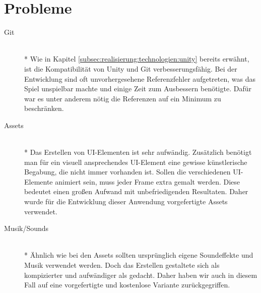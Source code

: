 \newpage
\section{Probleme}
\label{sec:implementierung:probleme}
\begin{description}
    \item[Git] \hfill \\* Wie in Kapitel \ref{subsec:realisierung:technologien:unity} bereits erwähnt, ist die Kompatibilität von Unity und Git verbesserungsfähig. Bei der Entwicklung sind oft unvorhergesehene Referenzfehler aufgetreten, was das Spiel unspielbar machte und einige Zeit zum Ausbessern benötigte. Dafür war es unter anderem nötig die Referenzen auf ein Minimum zu beschränken.
    \item[Assets] \hfill \\* Das Erstellen von UI-Elementen ist sehr aufwändig. Zusätzlich benötigt man für ein visuell ansprechendes UI-Element eine gewisse künstlerische Begabung, die nicht immer vorhanden ist. Sollen die verschiedenen UI-Elemente animiert sein, muss jeder Frame extra gemalt werden. Diese bedeutet einen großen Aufwand mit unbefriedigenden Resultaten. Daher wurde für die Entwicklung dieser Anwendung vorgefertigte Assets verwendet.
    \item[Musik/Sounds] \hfill \\* Ähnlich wie bei den Assets sollten ursprünglich eigene Soundeffekte und Musik verwendet werden. Doch das Erstellen gestaltete sich als kompizierter und aufwändiger als gedacht. Daher haben wir auch in diesem Fall auf eine vorgefertigte und kostenlose Variante zurückgegriffen.
\end{description}





























